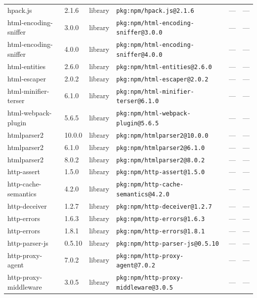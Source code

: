 \documentclass[11pt,a4paper]{article}
\begin{document}
\begin{longtable}{|p{4cm}|p{2cm}|p{1.6cm}|p{5cm}|p{1.5cm}|p{3.5cm}|}
\raggedright hpack.js & 2.1.6 & library & \small\texttt{pkg:npm/hpack.js@2.1.6} & — & \small — \\
\raggedright html-encoding-sniffer & 3.0.0 & library & \small\texttt{pkg:npm/html-encoding-sniffer@3.0.0} & — & \small — \\
\raggedright html-encoding-sniffer & 4.0.0 & library & \small\texttt{pkg:npm/html-encoding-sniffer@4.0.0} & — & \small — \\
\raggedright html-entities & 2.6.0 & library & \small\texttt{pkg:npm/html-entities@2.6.0} & — & \small — \\
\raggedright html-escaper & 2.0.2 & library & \small\texttt{pkg:npm/html-escaper@2.0.2} & — & \small — \\
\raggedright html-minifier-terser & 6.1.0 & library & \small\texttt{pkg:npm/html-minifier-terser@6.1.0} & — & \small — \\
\raggedright html-webpack-plugin & 5.6.5 & library & \small\texttt{pkg:npm/html-webpack-plugin@5.6.5} & — & \small — \\
\raggedright htmlparser2 & 10.0.0 & library & \small\texttt{pkg:npm/htmlparser2@10.0.0} & — & \small — \\
\raggedright htmlparser2 & 6.1.0 & library & \small\texttt{pkg:npm/htmlparser2@6.1.0} & — & \small — \\
\raggedright htmlparser2 & 8.0.2 & library & \small\texttt{pkg:npm/htmlparser2@8.0.2} & — & \small — \\
\raggedright http-assert & 1.5.0 & library & \small\texttt{pkg:npm/http-assert@1.5.0} & — & \small — \\
\raggedright http-cache-semantics & 4.2.0 & library & \small\texttt{pkg:npm/http-cache-semantics@4.2.0} & — & \small — \\
\raggedright http-deceiver & 1.2.7 & library & \small\texttt{pkg:npm/http-deceiver@1.2.7} & — & \small — \\
\raggedright http-errors & 1.6.3 & library & \small\texttt{pkg:npm/http-errors@1.6.3} & — & \small — \\
\raggedright http-errors & 1.8.1 & library & \small\texttt{pkg:npm/http-errors@1.8.1} & — & \small — \\
\raggedright http-parser-js & 0.5.10 & library & \small\texttt{pkg:npm/http-parser-js@0.5.10} & — & \small — \\
\raggedright http-proxy-agent & 7.0.2 & library & \small\texttt{pkg:npm/http-proxy-agent@7.0.2} & — & \small — \\
\raggedright http-proxy-middleware & 3.0.5 & library & \small\texttt{pkg:npm/http-proxy-middleware@3.0.5} & — & \small — \\

\end{longtable}
\end{document}
